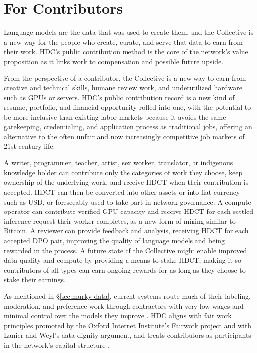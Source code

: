 \documentclass[10pt,a4paper,twocolumn]{article}
\begin{document}
\section{For Contributors}
\label{sec:contributors}

Language models are the data that was used to create them, and the Collective is a new way for the people who create, curate, and serve that data to earn from their work. HDC's public contribution method is the core of the network's value proposition as it links work to compensation and possible future upside.

From the perspective of a contributor, the Collective is a new way to earn from creative and technical skills, humane review work, and underutilized hardware such as GPUs or servers. HDC's public contribution record is a new kind of resume, portfolio, and financial opportunity rolled into one, with the potential to be more inclusive than existing labor markets because it avoids the same gatekeeping, credentialing, and application process as traditional jobs, offering an alternative to the often unfair and now increasingly competitive job markets of 21st century life.

A writer, programmer, teacher, artist, sex worker, translator, or indigenous knowledge holder can contribute only the categories of work they choose, keep ownership of the underlying work, and receive HDCT when their contribution is accepted. HDCT can then be converted into other assets or into fiat currency such as USD, or foreseeably used to take part in network governance. A compute operator can contribute verified GPU capacity and receive HDCT for each settled inference request their worker completes, as a new form of mining similar to Bitcoin. A reviewer can provide feedback and analysis, receiving HDCT for each accepted DPO pair, improving the quality of language models and being rewarded in the process. A future state of the Collective might enable improved data quality and compute by providing a means to stake HDCT, making it so contributors of all types can earn ongoing rewards for as long as they choose to stake their earnings.

As mentioned in \S\ref{sec:murky-data}, current systems route much of their labeling, moderation, and preference work through contractors with very low wages and minimal control over the models they improve \citep[ch.~9]{hao2025empire}. HDC aligns with fair work principles promoted by the Oxford Internet Institute's Fairwork project and with Lanier and Weyl's data dignity argument, and treats contributors as participants in the network's capital structure \citep{lanier2018dignity}.
\end{document}
